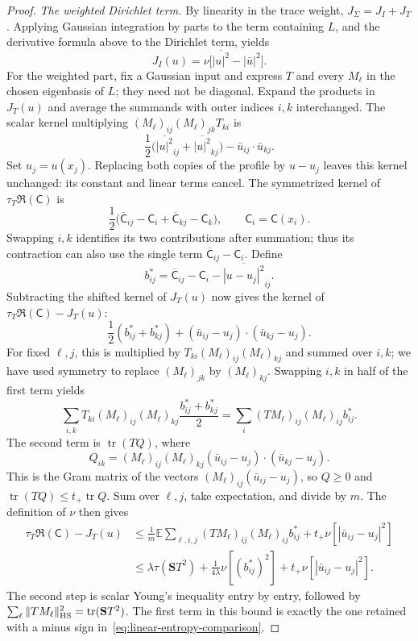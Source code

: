 \begin{proof}
\smallskip\noindent\emph{The weighted Dirichlet term.} By linearity in the trace weight, $J_\Sigma=J_I+J_T$.  Applying Gaussian integration by parts to the term containing $L$, and the derivative formula above to the Dirichlet term, yields
\[
 J_I(u)=\nu\bigl[\overline{|u|^2}-|\bar u|^2\bigr].
\]
For the weighted part, fix a Gaussian input and express $T$ and every $M_\ell$ in the chosen eigenbasis of $L$; they need not be diagonal. Expand the products in $J_T(u)$ and average the summands with outer indices $i,k$ interchanged. The scalar kernel multiplying $(M_\ell)_{ij}(M_\ell)_{jk}T_{ki}$ is
\[
 \frac12\bigl(\overline{|u|^2}_{ij}
                 +\overline{|u|^2}_{kj}\bigr)
          -\bar u_{ij}\cdot\bar u_{kj}.
\]
Set $u_j=u(x_j)$.  Replacing both copies of the profile by $u-u_j$ leaves this kernel unchanged: its constant and linear terms cancel. The symmetrized kernel of $\tau_T\mathfrak{R}(\mathsf C)$ is
\[
 \frac12\bigl(\overline{\mathsf C}_{ij}-\mathsf C_i
              +\overline{\mathsf C}_{kj}-\mathsf C_k\bigr),
 \qquad \mathsf C_i=\mathsf C(x_i).
\]
Swapping $i,k$ identifies its two contributions after summation; thus its contraction can also use the single term $\overline{\mathsf C}_{ij}-\mathsf C_i$. Define
\[
 b_{ij}^*=\overline{\mathsf C}_{ij}-\mathsf C_i
                         -\overline{|u-u_j|^2}_{ij}.
\]
Subtracting the shifted kernel of $J_T(u)$ now gives the kernel of $\tau_T\mathfrak{R}(\mathsf C)-J_T(u)$:
\[
 \frac12(b_{ij}^*+b_{kj}^*)
       +(\bar u_{ij}-u_j)\cdot(\bar u_{kj}-u_j).
\]
For fixed $\ell,j$, this is multiplied by $T_{ki}(M_\ell)_{ij}(M_\ell)_{kj}$ and summed over $i,k$; we have used symmetry to replace $(M_\ell)_{jk}$ by $(M_\ell)_{kj}$. Swapping $i,k$ in half of the first term yields
\[
 \sum_{i,k}T_{ki}(M_\ell)_{ij}(M_\ell)_{kj}
       \frac{b_{ij}^*+b_{kj}^*}{2}
   =\sum_i(TM_\ell)_{ij}(M_\ell)_{ij}b_{ij}^*.
\]
The second term is $\operatorname{tr}(TQ)$, where
\[
 Q_{ik}=(M_\ell)_{ij}(M_\ell)_{kj}
             (\bar u_{ij}-u_j)\cdot(\bar u_{kj}-u_j).
\]
This is the Gram matrix of the vectors $(M_\ell)_{ij}(\bar u_{ij}-u_j)$, so $Q\ge0$ and $\operatorname{tr}(TQ)\le t_+\operatorname{tr}Q$. Sum over $\ell,j$, take expectation, and divide by $m$. The definition of $\nu$ then gives
\begin{equation}
 \begin{aligned}
 \tau_T\mathfrak{R}(\mathsf C)-J_T(u)
 &\le\frac1m\mathbb{E}\sum_{\ell,i,j}
       (TM_\ell)_{ij}(M_\ell)_{ij}b_{ij}^*
             +t_+\nu[|\bar u_{ij}-u_j|^2]\\
 &\le\lambda\tau(\mathbf{S} T^2)
          +\frac1{4\lambda}\nu[(b_{ij}^*)^2]
          +t_+\nu[|\bar u_{ij}-u_j|^2].
 \end{aligned}
 \label{eq:pairwise-layer-upper-bound}
\end{equation}
The second step is scalar Young's inequality entry by entry, followed by $\sum_\ell\|TM_\ell\|_{\rm HS}^2 =\operatorname{tr}(\mathbf{S} T^2)$. The first term in this bound is exactly the one retained with a minus sign in~\eqref{eq:linear-entropy-comparison}.


\end{proof}
